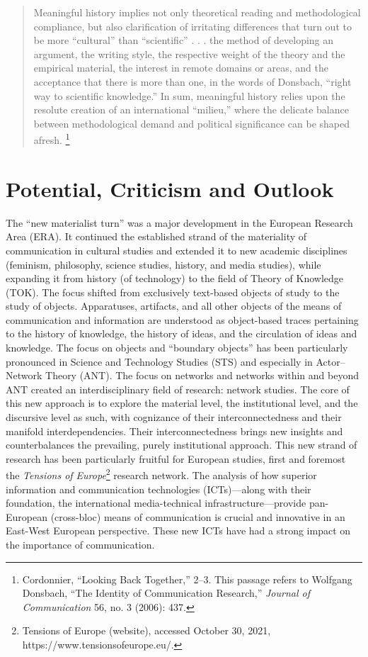 \documentclass{tufte-handout}
\begin{document}
\begin{quote}
Meaningful history implies not only theoretical reading and
methodological compliance, but also clarification of irritating
differences that turn out to be more ``cultural'' than ``scientific'' .
. . the method of developing an argument, the writing style, the
respective weight of the theory and the empirical material, the interest
in remote domains or areas, and the acceptance that there is more than
one, in the words of Donsbach, ``right way to scientific knowledge.'' In
sum, meaningful history relies upon the resolute creation of an
international ``milieu,'' where the delicate balance between
methodological demand and political significance can be shaped afresh.
\footnote{Cordonnier, ``Looking Back Together,'' 2--3. This passage
  refers to Wolfgang Donsbach, ``The Identity of Communication
  Research,'' \emph{Journal of Communication} 56, no. 3 (2006): 437.}
\end{quote}

\hypertarget{potential-criticism-and-outlook}{%
\section{Potential, Criticism and
Outlook}\label{potential-criticism-and-outlook}}

The ``new materialist turn'' was a major development in the European
Research Area (ERA). It continued the established strand of the
materiality of communication in cultural studies and extended it to new
academic disciplines (feminism, philosophy, science studies, history,
and media studies), while expanding it from history (of technology) to
the field of Theory of Knowledge (TOK). The focus shifted from
exclusively text-based objects of study to the study of objects.
Apparatuses, artifacts, and all other objects of the means of
communication and information are understood as object-based traces
pertaining to the history of knowledge, the history of ideas, and the
circulation of ideas and knowledge. The focus on objects and ``boundary
objects'' has been particularly pronounced in Science and Technology
Studies (STS) and especially in Actor--Network Theory (ANT). The focus
on networks and networks within and beyond ANT created an
interdisciplinary field of research: network studies. The core of this
new approach is to explore the material level, the institutional level,
and the discursive level as such, with cognizance of their
interconnectedness and their manifold interdependencies. Their
interconnectedness brings new insights and counterbalances the
prevailing, purely institutional approach. This new strand of research
has been particularly fruitful for European studies, first and foremost
the \emph{Tensions of Europe}\footnote{Tensions of Europe (website),
  accessed October 30, 2021, https://www.tensionsofeurope.eu/.} research
network. The analysis of how superior information and communication
technologies (ICTs)---along with their foundation, the international
media-technical infrastructure---provide pan-European (cross-bloc) means
of communication is crucial and innovative in an East-West European
perspective. These new ICTs have had a strong impact on the importance
of communication.
\end{document}
